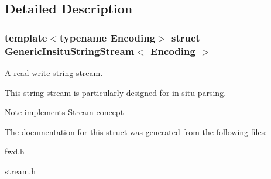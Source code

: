 \subsection{Detailed Description}
\subsubsection*{template$<$typename Encoding$>$\newline
struct Generic\+Insitu\+String\+Stream$<$ Encoding $>$}

A read-\/write string stream. 

This string stream is particularly designed for in-\/situ parsing. \begin{DoxyNote}{Note}
implements Stream concept 
\end{DoxyNote}


The documentation for this struct was generated from the following files\+:\begin{DoxyCompactItemize}
\item 
fwd.\+h\item 
stream.\+h\end{DoxyCompactItemize}
